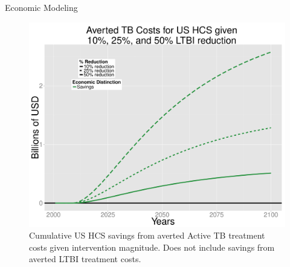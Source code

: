 \documentclass[final]{beamer}
\begin{document}
\begin{frame}
\begin{columns}[T]
\begin{column}{.3\textwidth}
\begin{block}{Economic Modeling}
\begin{figure}[h]
              \begin{minipage}[c]{0.6\textwidth}
                \includegraphics[height=0.7\textwidth,width=\textwidth]{costAvertedRedEnLTBI}
              \end{minipage}
              \hspace{0.5em}
              \begin{minipage}[c]{0.35\textwidth}
                   \caption{Cumulative US HCS savings from averted Active TB 
                                treatment costs given intervention magnitude.  
                                Does not include savings from averted LTBI treatment costs.}  
              \end{minipage}
              \label{fig:redEnLTBI_costs} 
            \end{figure}
      \end{block}
    \end{column}


\end{columns}
\end{frame}
\end{document}
